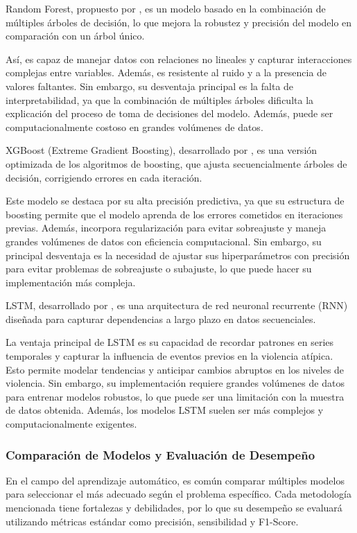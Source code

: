 Random Forest, propuesto por \citet{Breiman2001}, es un modelo basado en la combinación de múltiples {árboles de decisión}, lo que mejora la robustez y precisión del modelo en comparación con un árbol único.

Así, es capaz de manejar datos con relaciones no lineales y capturar interacciones complejas entre variables. Además, es resistente al ruido y a la presencia de valores faltantes. Sin embargo, su desventaja principal es la falta de interpretabilidad, ya que la combinación de múltiples árboles dificulta la explicación del proceso de toma de decisiones del modelo. Además, puede ser computacionalmente costoso en grandes volúmenes de datos.


XGBoost ({Extreme Gradient Boosting}), desarrollado por \citet{ChenGuestrin2016}, es una versión optimizada de los algoritmos de {boosting}, que ajusta secuencialmente árboles de decisión, corrigiendo errores en cada iteración.

Este modelo se destaca por su alta precisión predictiva, ya que su estructura de boosting permite que el modelo aprenda de los errores cometidos en iteraciones previas. Además, incorpora regularización para evitar sobreajuste y maneja grandes volúmenes de datos con eficiencia computacional. Sin embargo, su principal desventaja es la necesidad de ajustar sus hiperparámetros con precisión para evitar problemas de sobreajuste o subajuste, lo que puede hacer su implementación más compleja.


LSTM, desarrollado por \citet{HochreiterSchmidhuber1997}, es una arquitectura de {red neuronal recurrente (RNN)} diseñada para capturar dependencias a largo plazo en datos secuenciales.

La ventaja principal de LSTM es su capacidad de recordar patrones en series temporales y capturar la influencia de eventos previos en la violencia atípica. Esto permite modelar tendencias y anticipar cambios abruptos en los niveles de violencia. Sin embargo, su implementación requiere grandes volúmenes de datos para entrenar modelos robustos, lo que puede ser una limitación con la muestra de datos obtenida. Además, los modelos LSTM suelen ser más complejos y computacionalmente exigentes.

\subsubsection*{Comparación de Modelos y Evaluación de Desempeño}

En el campo del {aprendizaje automático}, es común comparar múltiples modelos para seleccionar el más adecuado según el problema específico. Cada metodología mencionada tiene fortalezas y debilidades, por lo que su desempeño se evaluará utilizando métricas estándar como {precisión, sensibilidad y F1-Score}.

